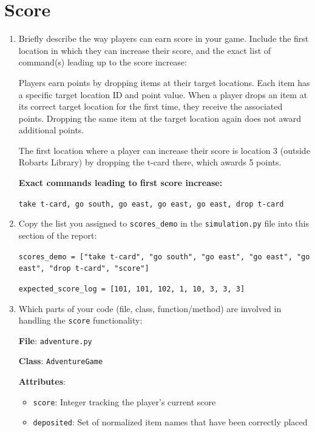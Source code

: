 \documentclass[11pt]{article}
\begin{document}
\section*{Score}
\begin{enumerate}
\item Briefly describe the way players can earn score in your game. Include the first location in which they can increase their score, and the exact list of command(s) leading up to the score increase:
    
    Players earn points by dropping items at their target locations. Each item has a specific target location ID and point value. When a player drops an item at its correct target location for the first time, they receive the associated points. Dropping the same item at the target location again does not award additional points.
    
    The first location where a player can increase their score is location 3 (outside Robarts Library) by dropping the t-card there, which awards 5 points.
    
    \textbf{Exact commands leading to first score increase:}
    
    \texttt{take t-card, go south, go east, go east, go east, drop t-card}

    \item Copy the list you assigned to \texttt{scores\_demo} in the \texttt{simulation.py} file into this section of the report:
    
    \texttt{scores\_demo = ["take t-card", "go south", "go east", "go east", "go east", "drop t-card", "score"]}
    
    \texttt{expected\_score\_log = [101, 101, 102, 1, 10, 3, 3, 3]}

    \item Which parts of your code (file, class, function/method) are involved in handling the \texttt{score} functionality:
    
    \textbf{File}: \texttt{adventure.py}
    
    \textbf{Class}: \texttt{AdventureGame}
    
    \textbf{Attributes}:
    \begin{itemize}
        \item \texttt{score}: Integer tracking the player's current score
        \item \texttt{deposited}: Set of normalized item names that have been correctly placed
    \end{itemize}
    

\end{enumerate}
\end{document}
